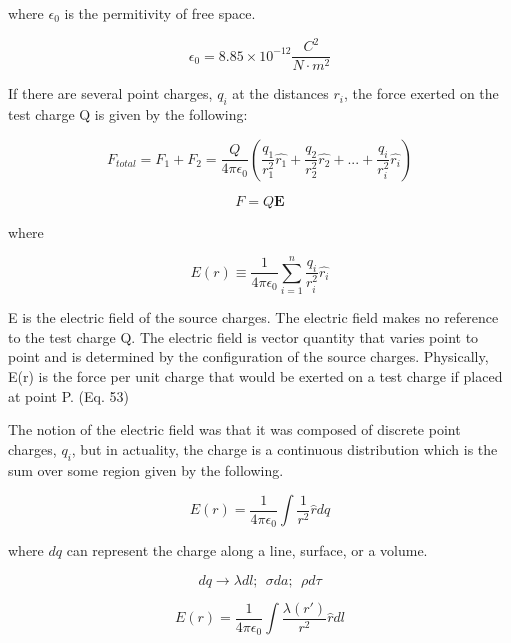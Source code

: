 where \( \epsilon_0 \) is the permitivity of free space.


\begin{equation}
\epsilon_0 = 8.85 \times 10^{-12 }\frac{C^2}{N\cdot m^2}
\end{equation}

If there are several point charges, \( q_i \) at the distances \( r_i \), the force exerted on the test charge Q is given by the following:

\begin{equation}
F_{total}=F_1 + F_2 = \frac{Q}{4\pi\epsilon_0}(\frac{q_1}{r_1^2}\hat{r_1}+\frac{q_2}{r_2^2}\hat{r_2} + ... + \frac{q_i}{r_i^2}\hat{r_i})
\end{equation}


\begin{equation}
F = Q \mathbf{E}
\end{equation}

where 

\begin{equation}
E(r) \equiv \frac{1}{4\pi\epsilon_0}\sum_{i=1}^{n}\frac{q_i}{r_i^2}\hat{r_i}
\end{equation}

E is the electric field of the source charges. The electric field makes no reference to the test charge Q.  The electric field is vector quantity that varies point to point and is determined by the configuration of the source charges. Physically, E(r) is the force per unit charge that would be exerted on a test charge if placed at point P. (Eq. 53)

The notion of the electric field was that it was composed of discrete point charges, \( q_i \), but in actuality, the charge is a continuous distribution which is the sum over some region given by the following.

\begin{equation}
E(r) = \frac{1}{4\pi\epsilon_0}\int\frac{1}{r^2}\hat{r}dq
\end{equation}

where \( dq \) can represent the charge along a line, surface, or a volume. 

\begin{equation}
dq \rightarrow  \lambda dl ;  \ \  \sigma da; \ \ \rho d\tau
\end{equation}

\begin{equation}
E(r) = \frac{1}{4\pi\epsilon_0}\int\frac{\lambda(r')}{r^2}\hat{r}dl
\end{equation}

